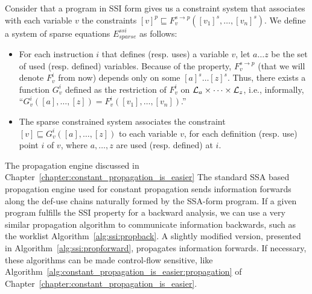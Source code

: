 {%
\begin{definition}
\label{def:ssi_eq}
Consider that a program in SSI form gives us a constraint system that 
associates with each variable $v$ the constraints $[v]^p \sqsubseteq  F_v^{s\to 
p}([v_1]^s, \dots, [v_n]^s)$. We define a system of sparse equations 
$E^{\textit{ssi}}_{\textit{sparse}}$ as follows:

\begin{itemize}

\item For each instruction $i$ that defines (resp. uses) a variable $v$, let $a 
  \dots z$ be the set of used (resp. defined) variables. Because of the \plink 
  property, $F^{s\to p}_v$ (that we will denote $F^i_v$ from now) depends only 
  on some $[a]^s \dots [z]^s$.
Thus, there exists a function $G^i_v$ defined as the restriction of $F^i_v$ on 
${\cal L}_a\times \dots \times{\cal L}_z$, i.e., informally, ``$G^i_v([a], 
\dots, [z]) = F^i_v([v_1],\dots, [v_n])$.''
\item The sparse constrained system associates the constraint $[v]  \sqsubseteq 
  G_v^i([a], \ldots, [z])$ to each variable $v$, for each definition (resp.  
  use) point $i$ of $v$, where $a,\dots, z$ are used (resp.  defined) at $i$.
\end{itemize}

\end{definition}

\ifconstantprop
The propagation engine discussed in Chapter~\ref{chapter:constant_propagation_is_easier}
\else
The standard SSA based propagation engine used for constant propagation
\fi
sends information forwards 
along the def-use chains naturally formed by the SSA-form program.
If a given program fulfills the SSI property for a backward 
analysis, we can use a very similar propagation 
algorithm to communicate information backwards, such as the worklist 
Algorithm~\ref{alg:ssi:propback}.
A slightly modified version, presented in Algorithm~\ref{alg:ssi:propforward},
propagates information forwards.
If necessary, these algorithms can be made control-flow sensitive\ifconstantprop, like 
Algorithm~\ref{alg:constant_propagation_is_easier:propagation} of 
Chapter~\ref{chapter:constant_propagation_is_easier}\fi.

\def\defall{
  \def\1{\qquad}
  \def\2{\1\1}
  \def\3{\2\1}
  \def\4{\2\2}
  \def\5{\3\2}
  \def\6{\4\2}
  \def\7{\5\2}
  \def\8{\6\2}
  \def\9{\7\2}
  \def\If{{\sf  if }}
  \def\Let{{\sf  let }}
  \def\Then{{\sf  then }}
  \def\Else{{\sf  else}}
  \def\Foreach{{\sf foreach }}
  \def\For{{\sf for }}
  \def\While{{\sf while }}
}


}

